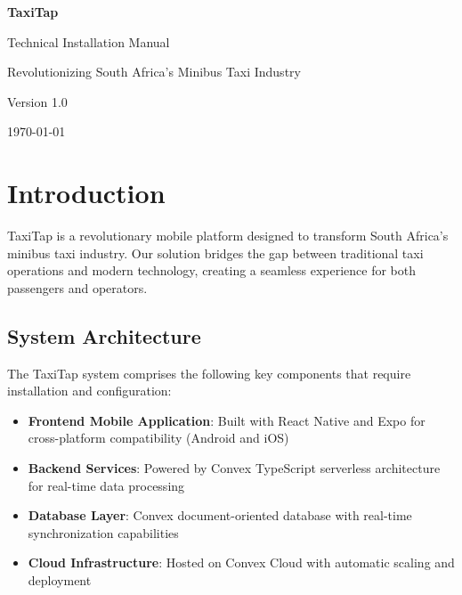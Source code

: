 \documentclass[11pt,a4paper]{article}
\begin{document}
\begin{titlepage}
    \centering
    \vspace*{2cm}
    
    {\Huge\bfseries TaxiTap \par}
    \vspace{1cm}
    {\Large Technical Installation Manual\par}
    \vspace{0.5cm}
    {\large Revolutionizing South Africa's Minibus Taxi Industry\par}
    
    \vspace{2cm}
    \vfill
    
    {\large Version 1.0\par}
    {\large\today\par}
\end{titlepage}

\tableofcontents
\newpage

\section{Introduction}

TaxiTap is a revolutionary mobile platform designed to transform South Africa's minibus taxi industry. Our solution bridges the gap between traditional taxi operations and modern technology, creating a seamless experience for both passengers and operators.

\subsection{System Architecture}

The TaxiTap system comprises the following key components that require installation and configuration:

\begin{itemize}
    \item \textbf{Frontend Mobile Application}: Built with React Native and Expo for cross-platform compatibility (Android and iOS)
    \item \textbf{Backend Services}: Powered by Convex TypeScript serverless architecture for real-time data processing
    \item \textbf{Database Layer}: Convex document-oriented database with real-time synchronization capabilities
    \item \textbf{Cloud Infrastructure}: Hosted on Convex Cloud with automatic scaling and deployment
\end{itemize}
\end{document}
